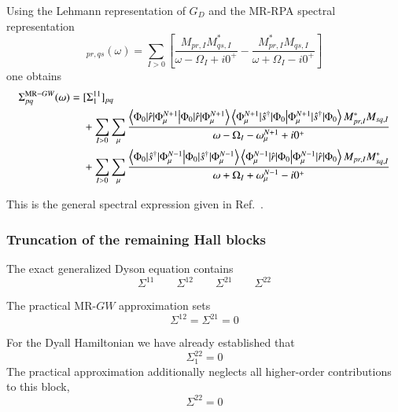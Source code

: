 \documentclass[aip,jcp,reprint,noshowkeys,superscriptaddress]{revtex4-1}
\begin{document}
Using the Lehmann representation of $G_D$ and the MR-RPA spectral
representation
\begin{equation}
  [w_D^c]_{pr,qs}(\omega)
  =
  \sum_{I>0}
  \left[
    \frac{
      M_{pr,I}M_{qs,I}^{*}
    }{
      \omega-\Omega_I+i0^+
    }
    -
    \frac{
      M_{pr,I}^{*}M_{qs,I}
    }{
      \omega+\Omega_I-i0^+
    }
  \right]
\end{equation}
one obtains
\begin{equation}
  \begin{aligned}
  \Sigma_{pq}^{\mathrm{MR-}GW}(\omega)
  ={}&
  [\Sigma_1^{11}]_{pq}
  \\
  &+
  \sum_{I>0}
  \sum_{\mu}
  \frac{
    \braket{
      \Phi_0
      |
      \hat r
      |
      \Phi_\mu^{N+1}
    }
    \braket{
      \Phi_\mu^{N+1}
      |
      \hat s^\dagger
      |
      \Phi_0
    }
    M_{pr,I}^{*}
    M_{sq,I}
  }{
    \omega
    -
    \Omega_I
    -
    \omega_\mu^{N+1}
    +
    i0^+
  }
  \\
  &+
  \sum_{I>0}
  \sum_{\mu}
  \frac{
    \braket{
      \Phi_0
      |
      \hat s^\dagger
      |
      \Phi_\mu^{N-1}
    }
    \braket{
      \Phi_\mu^{N-1}
      |
      \hat r
      |
      \Phi_0
    }
    M_{pr,I}
    M_{sq,I}^{*}
  }{
    \omega
    +
    \Omega_I
    +
    \omega_\mu^{N-1}
    -
    i0^+
  }
  \end{aligned}
  \label{eq:MRGW-spectral-task3}
\end{equation}

This is the general spectral expression given in
Ref.~\cite{WangFangLi2026}.


\subsubsection{Truncation of the remaining Hall blocks}

The exact generalized Dyson equation contains
\begin{equation}
  \Sigma^{11}
  \qquad
  \Sigma^{12}
  \qquad
  \Sigma^{21}
  \qquad
  \Sigma^{22}
\end{equation}

The practical MR-$GW$ approximation sets
\begin{equation}
  \Sigma^{12}
  =
  \Sigma^{21}
  =
  0
  \label{eq:MRGW-mixed-zero}
\end{equation}

For the Dyall Hamiltonian we have already established that
\begin{equation}
  \Sigma_1^{22}=0
\end{equation}
The practical approximation additionally neglects all higher-order
contributions to this block,
\begin{equation}
  \Sigma^{22}=0
  \label{eq:MRGW-22-zero}
\end{equation}
\end{document}
